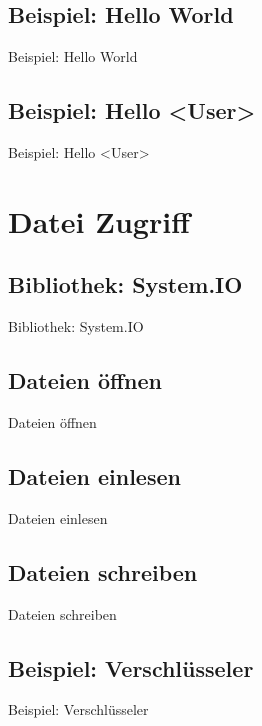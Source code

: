 \documentclass{beamer}
\begin{document}
\subsection{Beispiel: Hello World}
\begin{frame}{Beispiel: Hello World}
\end{frame}

\subsection{Beispiel: Hello <User>}
\begin{frame}{Beispiel: Hello <User>}
\end{frame}

\section{Datei Zugriff}
\subsection{Bibliothek: System.IO}
\begin{frame}{Bibliothek: System.IO}
\end{frame}

\subsection{Dateien öffnen}
\begin{frame}{Dateien öffnen}
\end{frame}

\subsection{Dateien einlesen}
\begin{frame}{Dateien einlesen}
\end{frame}

\subsection{Dateien schreiben}
\begin{frame}{Dateien schreiben}
\end{frame}

\subsection{Beispiel: Verschlüsseler}
\begin{frame}{Beispiel: Verschlüsseler}
\end{frame}
\end{document}
